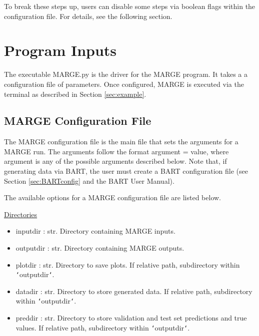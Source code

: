 \documentclass[letterpaper, 12pt]{article}
\begin{document}
\noindent To break these steps up, users can disable some steps via boolean 
flags within the configuration file.  For details, see the following section.


\section{Program Inputs}
\label{sec:inputs}

The executable MARGE.py is the driver for the MARGE program. It takes a 
a configuration file of parameters.  Once configured, MARGE is executed via 
the terminal as described in Section \ref{sec:example}.


\subsection{MARGE Configuration File}
\label{sec:config}
The MARGE configuration file is the main file that sets the arguments for a 
MARGE run. The arguments follow the format {\ttb argument = value}, where 
{\ttb argument} is any of the possible arguments described below. Note that, 
if generating data via BART, the user must create a BART configuration file 
(see Section \ref{sec:BARTconfig} and the BART User Manual).\newline

\noindent The available options for a MARGE configuration file are listed below.
\newline

\noindent \underline{Directories}
\begin{itemize}
\item inputdir   : str.  Directory containing MARGE inputs.
\item outputdir  : str.  Directory containing MARGE outputs.
\item plotdir    : str.  Directory to save plots. 
                         If relative path, subdirectory within 
                         \texttt{`}outputdir\texttt{`}.
\item datadir    : str.  Directory to store generated data. 
                         If relative path, subdirectory within 
                         \texttt{`}outputdir\texttt{`}.
\item preddir    : str.  Directory to store validation and test set predictions 
                         and true values. 
                         If relative path, subdirectory within 
                         \texttt{`}outputdir\texttt{`}.
\end{itemize}
\end{document}
